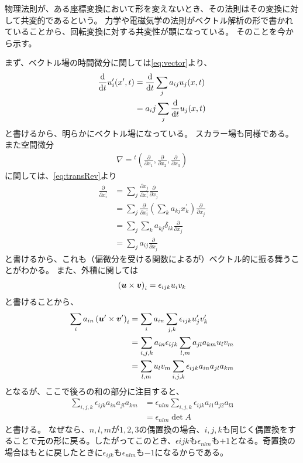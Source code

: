 \documentclass[a4paper]{jsarticle}
\def\vec#1{\mbox{\boldmath $#1$}}
\newcommand{\dif}[2]{\frac{{\rm d} #1}{{\rm d} #2}}
\newcommand{\pdif}[2]{\frac{\partial #1}{\partial #2}}
\begin{document}
物理法則が、ある座標変換において形を変えないとき、その法則はその変換に対して共変的であるという。
力学や電磁気学の法則がベクトル解析の形で書かれていることから、回転変換に対する共変性が顕になっている。
そのことを今から示す。

まず、ベクトル場の時間微分に関しては\eqref{eq:vector}より、
\begin{align}
	\dif{}{t} u_i^{\prime} (x^{\prime}, t)
	&= \dif{}{t} \sum_j a_{ij} u_j(x, t) \\
	&= a_ij \sum_j \dif{}{t} u_j(x, t)
\end{align}
と書けるから、明らかにベクトル場になっている。
スカラー場も同様である。
また空間微分
\begin{align}
	\nabla = {}^t\! \left( \pdif{}{x_1}, \pdif{}{x_2}, \pdif{}{x_3} \right)
\end{align}
に関しては、\eqref{eq:transRev}より
\begin{align}
	\pdif{}{x^{\prime}_i} &= \sum_j \pdif{x_j}{x^{\prime}_i} \pdif{}{x_j} \\
	&= \sum_j \pdif{}{x^{\prime}_i} \left( \sum_k a_{kj} x^{\prime}_k \right) \pdif{}{x_j} \\
	&= \sum_j \sum_k a_{kj} \delta_{ik} \pdif{}{x_j} \\
	&= \sum_j a_{ij} \pdif{}{x_j}
\end{align}
と書けるから、これも（偏微分を受ける関数によるが）ベクトル的に振る舞うことがわかる。
また、外積に関しては
\begin{align}
	\left(\vec{u} \times \vec{v}\right)_i = \epsilon_{ijk} u_i v_k
\end{align}
と書けることから、
\begin{align}
	\sum_i a_{in} \left( \vec{u}^{\prime} \times \vec{v}^{\prime} \right)_i
	&= \sum_{i} a_{in} \sum_{j,k} \epsilon_{ijk} u^{\prime}_j v^{\prime}_k \\
	&= \sum_{i,j,k} a_{in} \epsilon_{ijk} \sum_{l,m} a_{jl} a_{km} u_l v_m \\
	&= \sum_{l,m} u_l v_m \sum_{i,j,k} \epsilon_{ijk} a_{in} a_{jl} a_{km}
\end{align}
となるが、ここで後ろの和の部分に注目すると、
\begin{align}
	\sum_{i,j,k} \epsilon_{ijk} a_{in} a_{jl} a_{km}
	&= \epsilon_{nlm} \sum_{i,j,k} \epsilon_{ijk} a_{i1} a_{j2} a_{l3} \\
	&= \epsilon_{nlm} \det A
\end{align}
と書ける。
なぜなら、$n,l,m$が$1,2,3$の偶置換の場合、$i,j,k$も同じく偶置換をすることで元の形に戻る。したがってこのとき、$\epsilon{ijk}$も$\epsilon_{nlm}$も$+1$となる。奇置換の場合はもとに戻したときに$\epsilon_{ijk}$も$\epsilon_{nlm}$も$-1$になるからである。
\end{document}
